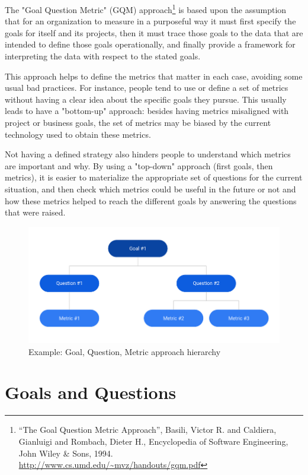 \documentclass[a4paper, 12pt]{book}
\begin{document}
The "Goal Question Metric" (GQM) approach\footnote{“The Goal Question Metric Approach”, Basili, Victor R. and Caldiera, Gianluigi and Rombach, Dieter H., Encyclopedia of Software Engineering, John Wiley & Sons, 1994. \url{http://www.cs.umd.edu/~mvz/handouts/gqm.pdf}} is based upon the assumption that for an organization to measure in a purposeful way it must first specify the goals for itself and its projects, then it must trace those goals to the data that are intended to define those goals operationally, and finally provide a framework for interpreting the data with respect to the stated goals.

This approach helps to define the metrics that matter in each case, avoiding some usual bad practices. For instance, people tend to use or define a set of metrics without having a clear idea about the specific goals they pursue. This usually leads to have a "bottom-up" approach: besides having metrics misaligned with project or business goals, the set of metrics may be biased by the current technology used to obtain these metrics.

Not having a defined strategy also hinders people to understand which metrics are important and why. By using a "top-down" approach (first goals, then metrics), it is easier to materialize the appropriate set of questions for the current situation, and then check which metrics could be useful in the future or not and how these metrics helped to reach the different goals by answering the questions that were raised.

\begin{figure}
 \centering
  \includegraphics[width=12cm, keepaspectratio]{img/example-gqm-schema}
  \caption{Example: Goal, Question, Metric approach hierarchy}
  \label{fig:example-gqm-schema}
\end{figure}

\section{Goals and Questions}
\end{document}

